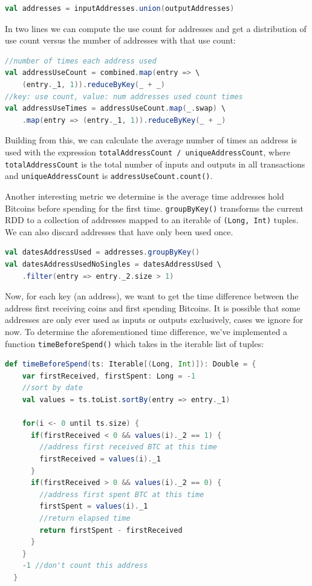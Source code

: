\documentclass[9pt,twocolumn,twoside]{idsi}
\begin{document}
\begin{lstlisting}[language=Scala]
val addresses = inputAddresses.union(outputAddresses)
\end{lstlisting}

In two lines we can compute the use count for addresses and get a distribution of use count versus the number of addresses with that use count:

\begin{lstlisting}[language=Scala]
//number of times each address used
val addressUseCount = combined.map(entry => \
    (entry._1, 1)).reduceByKey(_ + _)
//key: use count, value: num addresses used count times
val addressUseTimes = addressUseCount.map(_.swap) \
    .map(entry => (entry._1, 1)).reduceByKey(_ + _)
\end{lstlisting}

Building from this, we can calculate the average number of times an address is used with the expression \lstinline{totalAddressCount / uniqueAddressCount}, where \lstinline{totalAddressCount} is the total number of inputs and outputs in all transactions and \lstinline{uniqueAddressCount} is \lstinline{addressUseCount.count()}.

Another interesting metric we determine is the average time addresses hold Bitcoins before spending for the first time. \lstinline{groupByKey()} transforms the current RDD to a collection of addresses mapped to an iterable of \lstinline{(Long, Int)} tuples. We can also discard addresses that have only been used once.

\begin{lstlisting}[language=Scala]
val datesAddressUsed = addresses.groupByKey()
val datesAddressUsedNoSingles = datesAddressUsed \
    .filter(entry => entry._2.size > 1)
\end{lstlisting}

Now, for each key (an address), we want to get the time difference between the address first receiving coins and first spending Bitcoins. It is possible that some addresses are only ever used as inputs or outputs exclusively, cases we ignore for now. To determine the aforementioned time difference, we've implemented a function \lstinline{timeBeforeSpend()} which takes in the iterable list of tuples:

\begin{lstlisting}[language=Scala]
def timeBeforeSpend(ts: Iterable[(Long, Int)]): Double = {
    var firstReceived, firstSpent: Long = -1
    //sort by date
    val values = ts.toList.sortBy(entry => entry._1)

    for(i <- 0 until ts.size) {
      if(firstReceived < 0 && values(i)._2 == 1) {
        //address first received BTC at this time
        firstReceived = values(i)._1
      }
      if(firstReceived > 0 && values(i)._2 == 0) {
        //address first spent BTC at this time
        firstSpent = values(i)._1
        //return elapsed time
        return firstSpent - firstReceived
      }
    }
    -1 //don't count this address
  }
\end{lstlisting}
\end{document}

